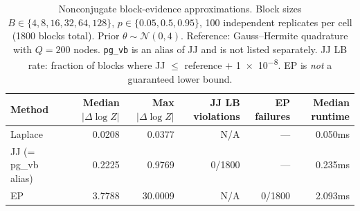 \begin{table}[ht]
\centering
\caption{Nonconjugate block-evidence approximations. Block sizes $B\in\{4,8,16,32,64,128\}$,
$p\in\{0.05,0.5,0.95\}$, 100 independent replicates per cell (1800 blocks total).
Prior $\theta\sim\mathcal{N}(0,4)$. Reference: Gauss--Hermite quadrature with $Q=200$ nodes.
\texttt{pg\_vb} is an alias of JJ and is not listed separately.
JJ LB rate: fraction of blocks where JJ $\le$ reference $+$ \num{1e-8}.
EP is \emph{not} a guaranteed lower bound.}
\label{tab:planned-nonconjugate-paper}
\begin{tabular}{lrrrrr}
\toprule
Method & Median $|\Delta\log Z|$ & Max $|\Delta\log Z|$ & JJ LB violations & EP failures & Median runtime \\
\midrule
  Laplace & 0.0208 & 0.0377 & N/A & --- & 0.050ms \\
  JJ (= pg\_vb alias) & 0.2225 & 0.9769 & 0/1800 & --- & 0.235ms \\
  EP & 3.7788 & 30.0009 & N/A & 0/1800 & 2.093ms \\
\bottomrule
\end{tabular}
\end{table}
